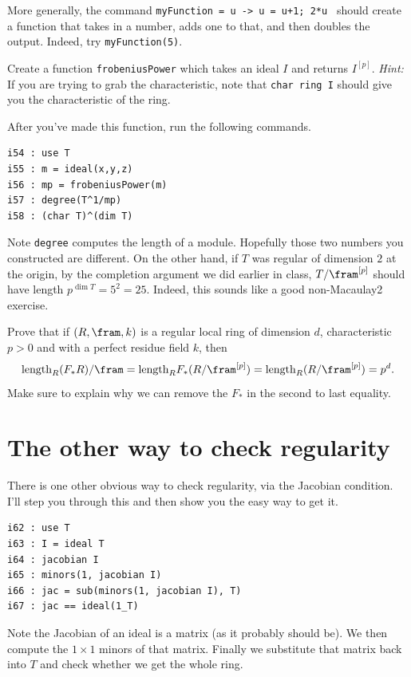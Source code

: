 \documentclass[12pt]{amsart}
\numberwithin{equation}{theorem}
\renewcommand{\:}{\colon}
\begin{document}
More generally, the command {\tt myFunction = u -> {u = u+1; 2*u} } should create a function that takes in a number, adds one to that, and then doubles the output.  Indeed, try {\tt myFunction(5)}.

\begin{exercise*}
Create a function {\tt frobeniusPower} which takes an ideal $I$ and returns $I^{[p]}$.  \vskip 3pt
\emph{Hint:} If you are trying to grab the characteristic, note that {\tt char ring I} should give you the characteristic of the ring.
\end{exercise*}

After you've made this function, run the following commands.
\begin{verbatim}
i54 : use T
i55 : m = ideal(x,y,z)
i56 : mp = frobeniusPower(m)
i57 : degree(T^1/mp)
i58 : (char T)^(dim T)
\end{verbatim}
Note {\tt degree} computes the length of a module.  Hopefully those two numbers you constructed are different.  On the other hand, if $T$ was regular of dimension $2$ at the origin, by the completion argument we did earlier in class, $T/\fram^{[p]}$ should have length $p^{\dim T} = 5^2 = 25$.  Indeed, this sounds like a good non-Macaulay2 exercise.

\begin{exercise*}
Prove that if $(R, \fram, k)$ is a regular local ring of dimension $d$, characteristic $p > 0$ and with a perfect residue field $k$, then
\[
\text{length}_R (F_* R)/\fram = \text{length}_R F_* (R/\fram^{[p]}) = \text{length}_R (R/\fram^{[p]}) = p^d.
\]
Make sure to explain why we can remove the $F_*$ in the second to last equality.
\end{exercise*}

\section{The other way to check regularity}

There is one other obvious way to check regularity, via the Jacobian condition.  I'll step you through this and then show you the easy way to get it.

\begin{verbatim}
i62 : use T
i63 : I = ideal T
i64 : jacobian I
i65 : minors(1, jacobian I)
i66 : jac = sub(minors(1, jacobian I), T)
i67 : jac == ideal(1_T)
\end{verbatim}
Note the Jacobian of an ideal is a matrix (as it probably should be).  We then compute the $1 \times 1$ minors of that matrix.  Finally we substitute that matrix back into $T$ and check whether we get the whole ring.
\end{document}
